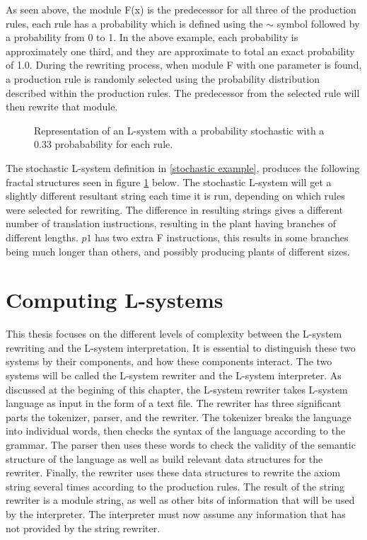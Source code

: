\noindent
As seen above, the module F(x) is the predecessor for all three of the production rules, each rule has a probability which is defined using the $\sim$ symbol followed by a probability from 0 to  1. In the above example, each probability is approximately one third, and they are approximate to total an exact probability of 1.0. During the rewriting process, when module F with one parameter is found, a production rule is randomly selected using the probability distribution described within the production rules. The predecessor from the selected rule will then rewrite that module.

\begin{figure}[htbp]
	{\centering
		\vspace{7px}
		\setlength{\fboxrule}{1pt}
		\caption{Representation of an L-system with a probability stochastic with a 0.33 probabability for each rule.} \label{stochastic diagram}
	}
\end{figure}
\FloatBarrier

\noindent
The stochastic L-system definition in \ref{stochastic example}, produces the following fractal structures seen in figure \ref{stochastic diagram} below. The stochastic L-system will get a slightly different resultant string each time it is run, depending on which rules were selected for rewriting. The difference in resulting strings gives a different number of translation instructions, resulting in the plant having branches of different lengths. $p1$ has two extra F instructions, this results in some branches being much longer than others, and possibly producing plants of different sizes. 

\section{Computing L-systems}

This thesis focuses on the different levels of complexity between the L-system rewriting and the L-system interpretation. It is essential to distinguish these two systems by their components, and how these components interact. The two systems will be called the L-system rewriter and the L-system interpreter. As discussed at the begining of this chapter, the L-system rewriter takes L-system language as input in the form of a text file. The rewriter has three significant parts the tokenizer, parser, and the rewriter. The tokenizer breaks the language into individual words, then checks the syntax of the language according to the grammar. The parser then uses these words to check the validity of the semantic structure of the language as well as build relevant data structures for the rewriter. Finally, the rewriter uses these data structures to rewrite the axiom string several times according to the production rules. The result of the string rewriter is a module string, as well as other bits of information that will be used by the interpreter. The interpreter must now assume any information that has not provided by the string rewriter. 

